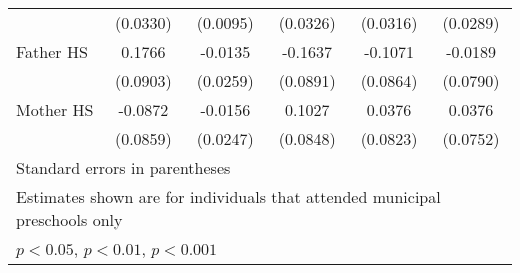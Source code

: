 \begin{table}[htbp]
\begin{tabular}{l*{5}{c}}
            &    (0.0330)         &    (0.0095)         &    (0.0326)         &    (0.0316)         &    (0.0289)         \\
\addlinespace
Father HS   &      0.1766         &     -0.0135         &     -0.1637         &     -0.1071         &     -0.0189         \\
            &    (0.0903)         &    (0.0259)         &    (0.0891)         &    (0.0864)         &    (0.0790)         \\
\addlinespace
Mother HS   &     -0.0872         &     -0.0156         &      0.1027         &      0.0376         &      0.0376         \\
            &    (0.0859)         &    (0.0247)         &    (0.0848)         &    (0.0823)         &    (0.0752)         \\
\bottomrule
\multicolumn{6}{l}{\footnotesize Standard errors in parentheses}\\
\multicolumn{6}{l}{\footnotesize Estimates shown are for individuals that attended municipal preschools only}\\
\multicolumn{6}{l}{\footnotesize \sym{*} \(p<0.05\), \sym{**} \(p<0.01\), \sym{***} \(p<0.001\)}\\
\end{tabular}
\end{table}
